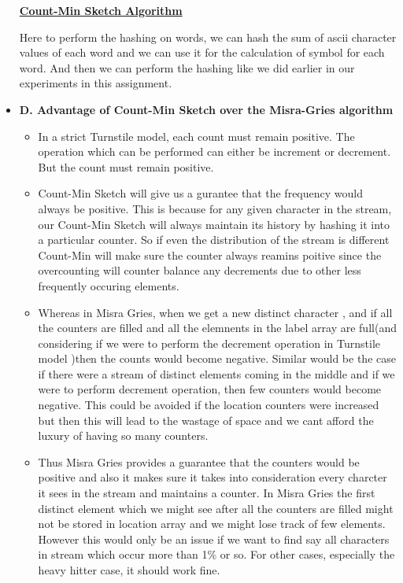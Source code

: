\documentclass[11pt]{article}
\begin{document}
\begin{itemize}
\textbf{\underline{Count-Min Sketch Algorithm}}

Here to perform the hashing on  words, we can hash the sum of ascii character values of each word and we can use it  for the calculation of symbol for each word. And then we can perform the hashing like we did earlier in our experiments in this assignment.

\item[] \textbf{D.  Advantage of Count-Min Sketch over the Misra-Gries algorithm}

\begin{itemize}

\item In a strict Turnstile model, each count must remain positive. The operation which can be performed can either be increment or decrement. But the count must remain positive.

\item Count-Min Sketch will give us a gurantee that the frequency would always be positive. This is because for any given character in the stream, our Count-Min Sketch will always maintain its history by hashing it into a particular counter. So if even the distribution of the stream is different Count-Min will make sure the counter always reamins poitive since the overcounting will counter balance any decrements due to other less frequently occuring elements.

\item Whereas in Misra Gries, when we get a new distinct character , and if all the counters are filled and all the elemnents in the label array are full(and considering if we were to perform the decrement operation in Turnstile model )then the counts would become negative. Similar would be the case if there were a stream of distinct elements coming in the middle and if we were to perform decrement operation, then few counters would become negative. This could be avoided if the location counters were increased but then this will lead to the wastage of space and we cant afford the luxury of having so many counters.


\item Thus Misra Gries provides a  guarantee that the counters would be positive and also it makes sure it takes into consideration every charcter it sees in the stream and maintains a counter. In Misra Gries the first distinct element which we might see after all the counters are filled might not be stored in location array and we might lose track of few elements. However this would only be an issue if we want to find say all characters in stream which occur more than 1\% or so. For other cases, especially the heavy hitter case, it should work fine.


\end{itemize}
\end{itemize}
\end{document}
